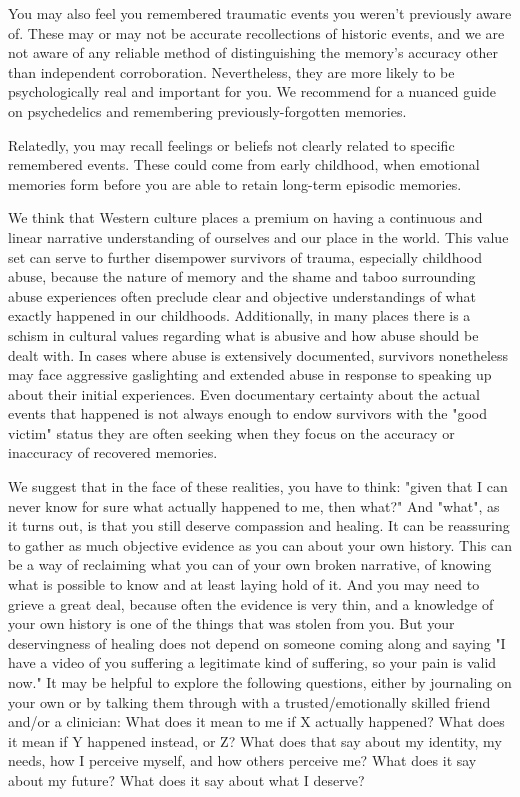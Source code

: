 \documentclass[12pt,letterpaper]{book}
\begin{document}
You may also feel you remembered traumatic events you weren't previously aware of. These may or may not be accurate recollections of historic events, and we are not aware of any reliable method of distinguishing the memory's accuracy other than independent corroboration. Nevertheless, they are more likely to be psychologically real and important for you. We recommend \textcite{psychedelicrecoveredmemory} for a nuanced guide on psychedelics and remembering previously-forgotten memories.

Relatedly, you may recall feelings or beliefs not clearly related to specific remembered events. These could come from early childhood, when emotional memories form before you are able to retain long-term episodic memories.

We think that Western culture places a premium on having a continuous and linear narrative understanding of ourselves and our place in the world. This value set can serve to further disempower survivors of trauma, especially childhood abuse, because the nature of memory and the shame and taboo surrounding abuse experiences often preclude clear and objective understandings of what exactly happened in our childhoods. Additionally, in many places there is a schism in cultural values regarding what is abusive and how abuse should be dealt with. In cases where abuse is extensively documented, survivors nonetheless may face aggressive gaslighting and extended abuse in response to speaking up about their initial experiences. Even documentary certainty about the actual events that happened is not always enough to endow survivors with the "good victim" status they are often seeking when they focus on the accuracy or inaccuracy of recovered memories.

We suggest that in the face of these realities, you have to think: "given that I can never know for sure what actually happened to me, then what?" And "what", as it turns out, is that you still deserve compassion and healing. It can be reassuring to gather as much objective evidence as you can about your own history. This can be a way of reclaiming what you can of your own broken narrative, of knowing what is possible to know and at least laying hold of it. And you may need to grieve a great deal, because often the evidence is very thin, and a knowledge of your own history is one of the things that was stolen from you. But your deservingness of healing does not depend on someone coming along and saying "I have a video of you suffering a legitimate kind of suffering, so your pain is valid now." It may be helpful to explore the following questions, either by journaling on your own or by talking them through with a trusted/emotionally skilled friend and/or a clinician: What does it mean to me if X actually happened? What does it mean if Y happened instead, or Z? What does that say about my identity, my needs, how I perceive myself, and how others perceive me? What does it say about my future? What does it say about what I deserve?
\end{document}
